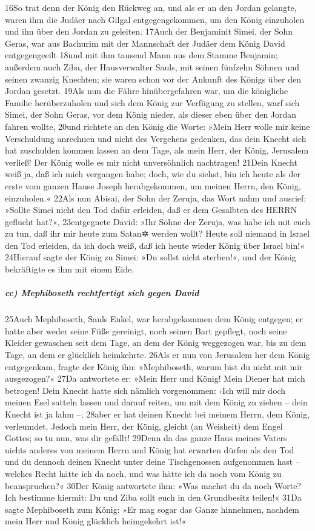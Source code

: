 16So trat denn der König den Rückweg an, und als er an den Jordan
gelangte, waren ihm die Judäer nach Gilgal entgegengekommen, um den
König einzuholen und ihn über den Jordan zu geleiten. 17Auch der
Benjaminit Simei, der Sohn Geras, war aus Bachurim mit der Mannschaft
der Judäer dem König David entgegengeeilt 18und mit ihm tausend Mann aus
dem Stamme Benjamin; außerdem auch Ziba, der Hausverwalter Sauls, mit
seinen fünfzehn Söhnen und seinen zwanzig Knechten; sie waren schon vor
der Ankunft des Königs über den Jordan gesetzt. 19Als nun die Fähre
hinübergefahren war, um die königliche Familie herüberzuholen und sich
dem König zur Verfügung zu stellen, warf sich Simei, der Sohn Geras, vor
dem König nieder, als dieser eben über den Jordan fahren wollte, 20und
richtete an den König die Worte: »Mein Herr wolle mir keine Verschuldung
anrechnen und nicht des Vergehens gedenken, das dein Knecht sich hat
zuschulden kommen lassen an dem Tage, als mein Herr, der König,
Jerusalem verließ! Der König wolle es mir nicht unversöhnlich
nachtragen! 21Dein Knecht weiß ja, daß ich mich vergangen habe; doch,
wie du siehst, bin ich heute als der erste vom ganzen Hause Joseph
herabgekommen, um meinen Herrn, den König, einzuholen.« 22Als nun
Abisai, der Sohn der Zeruja, das Wort nahm und ausrief: »Sollte Simei
nicht den Tod dafür erleiden, daß er dem Gesalbten des HERRN geflucht
hat?«, 23entgegnete David: »Ihr Söhne der Zeruja, was habe ich mit euch
zu tun, daß ihr mir heute zum Satan✲ werden wollt? Heute soll niemand in
Israel den Tod erleiden, da ich doch weiß, daß ich heute wieder König
über Israel bin!« 24Hierauf sagte der König zu Simei: »Du sollst nicht
sterben!«, und der König bekräftigte es ihm mit einem Eide.

\hypertarget{cc-mephiboseth-rechtfertigt-sich-gegen-david}{%
\subparagraph{cc) Mephiboseth rechtfertigt sich gegen
David}\label{cc-mephiboseth-rechtfertigt-sich-gegen-david}}

25Auch Mephiboseth, Sauls Enkel, war herabgekommen dem König entgegen;
er hatte aber weder seine Füße gereinigt, noch seinen Bart gepflegt,
noch seine Kleider gewaschen seit dem Tage, an dem der König weggezogen
war, bis zu dem Tage, an dem er glücklich heimkehrte. 26Als er nun von
Jerusalem her dem König entgegenkam, fragte der König ihn: »Mephiboseth,
warum bist du nicht mit mir ausgezogen?« 27Da antwortete er: »Mein Herr
und König! Mein Diener hat mich betrogen! Dein Knecht hatte sich nämlich
vorgenommen: ›Ich will mir doch meinen Esel satteln lassen und darauf
reiten, um mit dem König zu ziehen -- dein Knecht ist ja lahm --; 28aber
er hat deinen Knecht bei meinem Herrn, dem König, verleumdet. Jedoch
mein Herr, der König, gleicht (an Weisheit) dem Engel Gottes; so tu nun,
was dir gefällt! 29Denn da das ganze Haus meines Vaters nichts anderes
von meinem Herrn und König hat erwarten dürfen als den Tod und du
dennoch deinen Knecht unter deine Tischgenossen aufgenommen hast --
welches Recht hätte ich da noch, und was hätte ich da noch vom König zu
beanspruchen?« 30Der König antwortete ihm: »Was machst du da noch Worte?
Ich bestimme hiermit: Du und Ziba sollt euch in den Grundbesitz teilen!«
31Da sagte Mephiboseth zum König: »Er mag sogar das Ganze hinnehmen,
nachdem mein Herr und König glücklich heimgekehrt ist!«

